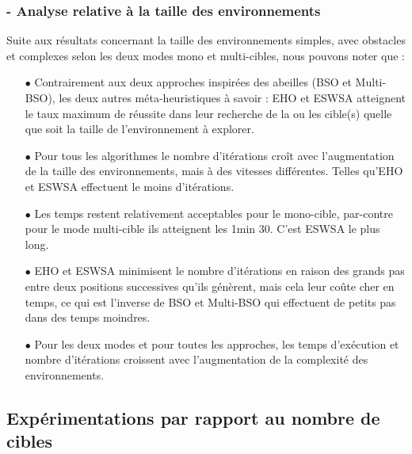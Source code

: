 	\subsubsection{- Analyse relative à la taille des environnements}
	Suite aux résultats concernant la taille des environnements simples, avec obstacles et complexes selon les deux modes mono et multi-cibles, nous pouvons noter que :
	\begin{itemize}
		\item[$\bullet$] Contrairement aux deux approches inspirées des abeilles (BSO et Multi-BSO), les deux autres méta-heuristiques à savoir : EHO et ESWSA atteignent le taux maximum de réussite dans leur recherche de la ou les cible(s) quelle que soit la taille de l'environnement à explorer.
		\item[$\bullet$] Pour tous les algorithmes le nombre d'itérations croît avec l'augmentation de la taille des environnements, mais à des vitesses différentes. Telles qu'EHO et ESWSA effectuent le moins d'itérations.
		\item[$\bullet$] Les temps restent relativement acceptables pour le mono-cible, par-contre pour le mode multi-cible ils atteignent les 1min 30. C'est ESWSA le plus long.
		
		\item[$\bullet$] EHO et ESWSA minimisent le nombre d'itérations en raison des grands pas entre deux positions successives qu'ils génèrent, mais cela leur coûte cher en temps, ce qui est l'inverse de BSO et Multi-BSO qui effectuent de petits pas dans des temps moindres.
		
		\item[$\bullet$] Pour les deux modes et pour toutes les approches, les temps d'exécution et nombre d'itérations croissent avec l'augmentation de la complexité des environnements.
	\end{itemize}
	
	
	
	
	
	\subsection{Expérimentations par rapport au nombre de cibles}
	
